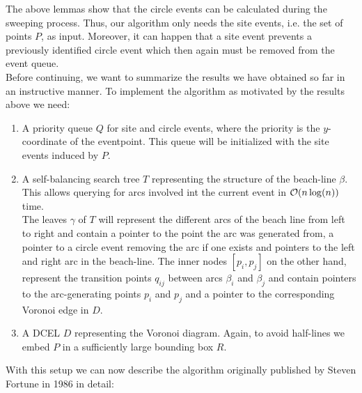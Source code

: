         The above lemmas show that the circle events can be calculated during the sweeping process. Thus, our algorithm only needs the site events, i.e. the set of points $P$, as input. Moreover, it can happen that a site event prevents a previously identified circle event which then again must be removed from the event queue. \\
        Before continuing, we want to summarize the results we have obtained so far in an instructive manner. To implement the algorithm as motivated by the results above we need:
        \begin{enumerate}
            \item A priority queue $Q$ for site and circle events, where the priority is the $y$-coordinate of the eventpoint. This queue will be initialized with the site events induced by $P$.
            \item A self-balancing search tree $T$ representing the structure of the beach-line $\beta$. This allows querying for arcs involved int the current event in $\mathcal{O}(n\log(n))$ time. \\ 
            The leaves $\gamma$ of $T$ will represent the different arcs of the beach line from left to right and contain a pointer to the point the arc was generated from, a pointer to a circle event removing the arc if one exists and pointers to the left and right arc in the beach-line. The inner nodes $[p_i, p_j]$ on the other hand, represent the transition points $q_{ij}$ between arcs $\beta_i$ and $\beta_j$ and contain pointers to the arc-generating points $p_i$ and $p_j$ and a pointer to the corresponding Voronoi edge in $D$. 
            \item A DCEL $D$ representing the Voronoi diagram. Again, to avoid half-lines we embed $P$ in a sufficiently large bounding box $R$.
        \end{enumerate}

        With this setup we can now describe the algorithm originally published by Steven Fortune in 1986 in detail:

